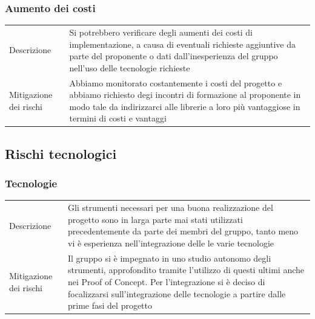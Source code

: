 \documentclass{article}
\begin{document}
\subsubsection{Aumento dei costi}
\begin{center}
\begin{tabular}{P{10em} P{20em}} 
     Descrizione &  Si potrebbero verificare degli aumenti dei costi di implementazione, a causa di eventuali richieste aggiuntive da parte del proponente o dati dall'inesperienza del gruppo nell'uso delle tecnologie richieste\\ 
    Mitigazione dei rischi &  Abbiamo monitorato costantemente i costi del progetto e abbiamo richiesto degi incontri di formazione al proponente in modo tale da indirizzarci alle librerie a loro più vantaggiose in termini di costi e vantaggi\\
\end{tabular}
\label{tab:mitcosti}
\end{center}


\subsection{Rischi tecnologici}


\subsubsection{Tecnologie}\begin{center}
\begin{tabular}{P{10em} P{20em}} 
     Descrizione & Gli strumenti necessari per una buona realizzazione del progetto sono in larga parte mai stati utilizzati precedentemente da parte dei membri del gruppo, tanto meno vi è esperienza nell'integrazione delle le varie tecnologie\\ 
    Mitigazione dei rischi & Il gruppo si è impegnato in uno studio autonomo degli strumenti, approfondito tramite l'utilizzo di questi ultimi anche nei Proof of Concept. Per l'integrazione si è deciso di focalizzarsi sull'integrazione delle tecnologie a partire dalle prime fasi del progetto\\
\end{tabular}
\label{tab:mittecnologie}
\end{center}
\end{document}
